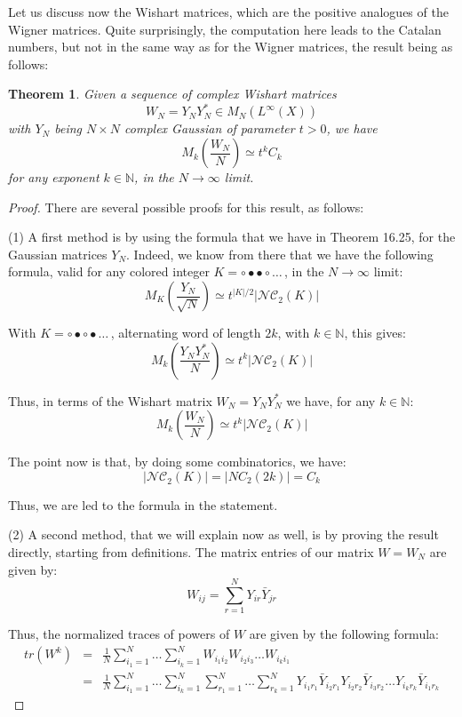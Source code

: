 \documentclass[12pt]{amsbook}
\newtheorem{theorem}{Theorem}[chapter]
\begin{document}
Let us discuss now the Wishart matrices, which are the positive analogues of the Wigner matrices. Quite surprisingly, the computation here leads to the Catalan numbers, but not in the same way as for the Wigner matrices, the result being as follows:

\begin{theorem}
Given a sequence of complex Wishart matrices
$$W_N=Y_NY_N^*\in M_N(L^\infty(X))$$
with $Y_N$ being $N\times N$ complex Gaussian of parameter $t>0$, we have
$$M_k\left(\frac{W_N}{N}\right)\simeq t^kC_k$$
for any exponent $k\in\mathbb N$, in the $N\to\infty$ limit.
\end{theorem}

\begin{proof}
There are several possible proofs for this result, as follows:

\medskip

(1) A first method is by using the formula that we have in Theorem 16.25, for the Gaussian matrices $Y_N$. Indeed, we know from there that we have the following formula, valid for any colored integer $K=\circ\bullet\bullet\circ\ldots\,$, in the $N\to\infty$ limit:
$$M_K\left(\frac{Y_N}{\sqrt{N}}\right)\simeq t^{|K|/2}|\mathcal{NC}_2(K)|$$

With $K=\circ\bullet\circ\bullet\ldots\,$, alternating word of length $2k$, with $k\in\mathbb N$, this gives:
$$M_k\left(\frac{Y_NY_N^*}{N}\right)\simeq t^k|\mathcal{NC}_2(K)|$$

Thus, in terms of the Wishart matrix $W_N=Y_NY_N^*$ we have, for any $k\in\mathbb N$:
$$M_k\left(\frac{W_N}{N}\right)\simeq t^k|\mathcal{NC}_2(K)|$$

The point now is that, by doing some combinatorics, we have:
$$|\mathcal{NC}_2(K)|=|NC_2(2k)|=C_k$$

Thus, we are led to the formula in the statement.

\medskip

(2) A second method, that we will explain now as well, is by proving the result directly, starting from definitions. The matrix entries of our matrix $W=W_N$ are given by:
$$W_{ij}=\sum_{r=1}^NY_{ir}\bar{Y}_{jr}$$

Thus, the normalized traces of powers of $W$ are given by the following formula:
\begin{eqnarray*}
tr(W^k)
&=&\frac{1}{N}\sum_{i_1=1}^N\ldots\sum_{i_k=1}^NW_{i_1i_2}W_{i_2i_3}\ldots W_{i_ki_1}\\
&=&\frac{1}{N}\sum_{i_1=1}^N\ldots\sum_{i_k=1}^N\sum_{r_1=1}^N\ldots\sum_{r_k=1}^NY_{i_1r_1}\bar{Y}_{i_2r_1}Y_{i_2r_2}\bar{Y}_{i_3r_2}\ldots Y_{i_kr_k}\bar{Y}_{i_1r_k}
\end{eqnarray*}


\end{proof}
\end{document}
